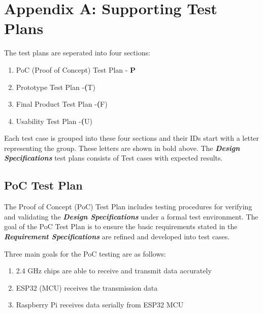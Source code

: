 

\setcounter{section}{8}
\section{Appendix A: Supporting Test Plans}
\bigskip

The test plans are seperated into four sections: 
\begin{enumerate}
    \item PoC (Proof of Concept) Test Plan - \textbf{P}
    \item Prototype Test Plan -\textbf(T)
    \item Final Product Test Plan -\textbf(F)
    \item Usability Test Plan -\textbf(U)
\end{enumerate}
Each test case is grouped into these four sections and their IDs start with a letter representing the group. These letters are shown in bold above.
The \textbf{\textit{Design Specifications}} test plans consists of Test cases with expected results.


\pagebreak

\subsection{PoC Test Plan}

The Proof of Concept (PoC) Test Plan includes testing procedures for verifying and validating the \textbf{\textit{Design Specifications}} under a formal test environment. The goal of the PoC Test Plan is to ensure the basic requirements stated in the \textbf{\textit{Requirement Specifications}} are refined and developed into test cases.

\medskip
Three main goals for the PoC testing are as follows:
\begin{enumerate}
    \item 2.4 GHz chips are able to receive and transmit data accurately
    \item ESP32 (MCU) receives the transmission data 
    \item Raspberry Pi receives data serially from ESP32 MCU
\end{enumerate}

